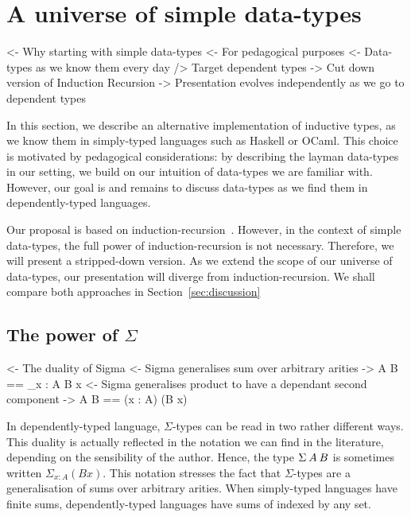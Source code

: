 \section{A universe of simple data-types}

\begin{wstructure}
<- Why starting with simple data-types
    <- For pedagogical purposes
        <- Data-types as we know them every day
        /> Target dependent types
    -> Cut down version of Induction Recursion
        -> Presentation evolves independently as we go to dependent types
\end{wstructure}

In this section, we describe an alternative implementation of
inductive types, as we know them in simply-typed languages such as
Haskell or OCaml. This choice is motivated by pedagogical
considerations: by describing the layman data-types in our setting, we
build on our intuition of data-types we are familiar with. However,
our goal is and remains to discuss data-types as we find them in
dependently-typed languages.

Our proposal is based on induction-recursion~\cite{dybjer:general-ir,
  dybjer:axiom-ir, dybjer:ir-initial-algebra, dybjer:iir}. However, in
the context of simple data-types, the full power of
induction-recursion is not necessary. Therefore, we will present a
stripped-down version. As we extend the scope of our universe of
data-types, our presentation will diverge from induction-recursion. We
shall compare both approaches in Section~\ref{sec:discussion}

\subsection{The power of $\Sigma$}

\begin{wstructure}
<- The duality of Sigma
    <- Sigma generalises sum over arbitrary arities
        -> \Sigma A B == \Sigma_{x : A} B x
    <- Sigma generalises product to have a dependant second component
        -> \Sigma A B == (x : A) \times (B x)
\end{wstructure}

In dependently-typed language, $\Sigma$-types can be read in two
rather different ways. This duality is actually reflected in the
notation we can find in the literature, depending on the sensibility
of the author. Hence, the type $\SigmaTy{A}{B}$ is sometimes written
$\Sigma_{x : A} (B x)$. This notation stresses the fact that
$\Sigma$-types are a generalisation of sums over arbitrary
arities. When simply-typed languages have finite sums,
dependently-typed languages have sums of indexed by any set.

